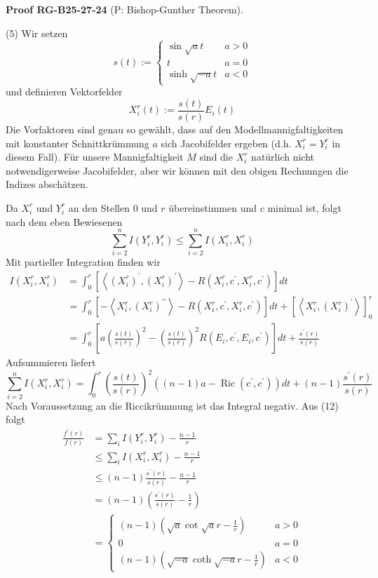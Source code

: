 \documentclass[10pt, letterpaper]{article}
\newcommand{\CustomHeading}[3]{%
  \par\medskip\noindent%
  \textbf{#1 #2} \textnormal{(#3)}.\enskip%
}
\newenvironment{PROOF}[2]{\begin{unitbox}\CustomHeading{Proof}{#1}{#2}}{\end{unitbox}}
\begin{document}
\begin{PROOF}{RG-B25-27-24}{P: Bishop-Gunther Theorem}
(5) Wir setzen
$$
s(t):= \begin{cases}\sin \sqrt{a} t & a>0 \\ t & a=0 \\ \sinh \sqrt{-a} t & a<0\end{cases}
$$
und definieren Vektorfelder
$$
X_{i}^{r}(t):=\frac{s(t)}{s(r)} E_{i}(t)
$$
Die Vorfaktoren sind genau so gewählt, dass auf den Modellmannigfaltigkeiten mit konstanter Schnittkrümmung $a$ sich Jacobifelder ergeben (d.h. $X_{i}^{r}=Y_{i}^{r}$ in diesem Fall). Für unsere Mannigfaltigkeit $M$ sind die $X_{i}^{r}$ natürlich nicht notwendigerweise Jacobifelder, aber wir können mit den obigen Rechnungen die Indizes abschätzen.

Da $X_{i}^{r}$ und $Y_{i}^{r}$ an den Stellen 0 und $r$ übereinstimmen und $c$ minimal ist, folgt nach dem eben Bewiesenen
$$
\sum_{i=2}^{n} I\left(Y_{i}^{r}, Y_{i}^{r}\right) \leq \sum_{i=2}^{n} I\left(X_{i}^{r}, X_{i}^{r}\right)
$$
Mit partieller Integration finden wir
$$
\begin{aligned}
I\left(X_{i}^{r}, X_{i}^{r}\right) & =\int_{0}^{r}\left[\left\langle\left(X_{i}^{r}\right)^{\prime},\left(X_{i}^{r}\right)^{\prime}\right\rangle-R\left(X_{i}^{r}, c^{\prime}, X_{i}^{r}, c^{\prime}\right)\right] d t \\
& =\int_{0}^{r}\left[-\left\langle X_{i}^{r},\left(X_{i}^{r}\right)^{\prime \prime}\right\rangle-R\left(X_{i}^{r}, c^{\prime}, X_{i}^{r}, c^{\prime}\right)\right] d t+\left[\left\langle X_{i}^{r},\left(X_{i}^{r}\right)^{\prime}\right\rangle\right]_{0}^{r} \\
& =\int_{0}^{r}\left[a\left(\frac{s(t)}{s(r)}\right)^{2}-\left(\frac{s(t)}{s(r)}\right)^{2} R\left(E_{i}, c^{\prime}, E_{i}, c^{\prime}\right)\right] d t+\frac{s^{\prime}(r)}{s(r)}
\end{aligned}
$$
Aufsummieren liefert
$$
\sum_{i=2}^{n} I\left(X_{i}^{r}, X_{i}^{r}\right)=\int_{0}^{r}\left(\frac{s(t)}{s(r)}\right)^{2}\left((n-1) a-\operatorname{Ric}\left(c^{\prime}, c^{\prime}\right)\right) d t+(n-1) \frac{s^{\prime}(r)}{s(r)}
$$
Nach Voraussetzung an die Riccikrümmung ist das Integral negativ. Aus (12) folgt
$$
\begin{aligned}
\frac{f^{\prime}(r)}{f(r)} & =\sum_{i} I\left(Y_{i}^{r}, Y_{i}^{r}\right)-\frac{n-1}{r} \\
& \leq \sum_{i} I\left(X_{i}^{r}, X_{i}^{r}\right)-\frac{n-1}{r} \\
& \leq(n-1) \frac{s^{\prime}(r)}{s(r)}-\frac{n-1}{r} \\
& =(n-1)\left(\frac{s^{\prime}(r)}{s(r)}-\frac{1}{r}\right) \\
& = \begin{cases}(n-1)\left(\sqrt{a} \cot \sqrt{a} r-\frac{1}{r}\right) & a>0 \\
0 & a=0 \\
(n-1)\left(\sqrt{-a} \operatorname{coth} \sqrt{-a} r-\frac{1}{r}\right) & a<0\end{cases}
\end{aligned}
$$


\end{PROOF}
\end{document}
